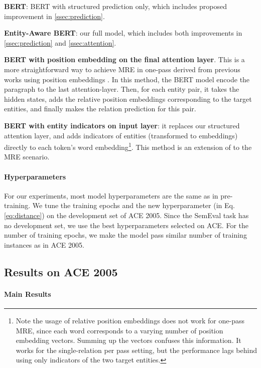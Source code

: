 \documentclass[11pt,a4paper]{article}
\begin{document}
\noindent  \textbf{BERT}: {BERT with structured prediction only}, which includes proposed improvement in \ref{ssec:prediction}.

\noindent  \textbf{Entity-Aware BERT}: our full model, which includes both improvements in \cref{ssec:prediction} and \cref{ssec:attention}.

\noindent  \textbf{BERT with position embedding on the final attention layer}. This is a more straightforward way to achieve MRE in one-pass derived from previous works using position embeddings \cite{nguyen2015combining,fu2017domain,shi2018genre}.
In this method, the BERT model encode the paragraph to the last attention-layer. Then, for each entity pair, it takes the hidden states, adds the relative position embeddings corresponding to the target entities, and finally makes the relation prediction for this pair.

\noindent  \textbf{BERT with entity indicators on input layer}: it replaces our structured attention layer, and adds indicators of entities (transformed to embeddings) directly to each token's word embedding\footnote{Note the usage of relative position embeddings does not work for one-pass MRE, since each word corresponds to a varying number of position embedding vectors. Summing up the vectors confuses this information. It works for the single-relation per pass setting, but the performance lags behind using only indicators of the two target entities.}. This method is an extension of \cite{verga2018re} to the MRE scenario. 

\paragraph{Hyperparameters}
For our experiments, most model hyperparameters are the same as in pre-training. We tune the training epochs and the new hyperparameter  (in Eq. \ref{eq:distance}) on the development set of ACE 2005.
Since the SemEval task has no development set, we use the best hyperparameters selected on ACE. For the number of training epochs, we make the model pass similar number of training instances as in ACE 2005.



\subsection{Results on ACE 2005}

\paragraph{Main Results}
\end{document}

